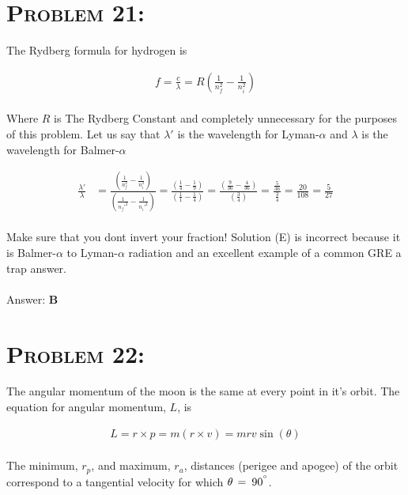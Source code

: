 \documentclass{article}
\begin{document}

\section{\textsc{Problem 21:}} The Rydberg formula for hydrogen is

\begin{gather}
f = \frac{c}{\lambda} = R \left(  \frac{1}{n_{f}^{2}} - \frac{1}{n_{i}^{2}}  \right)
\end{gather}
\\
Where $R$ is The Rydberg Constant and completely unnecessary for the purposes of this problem. Let us say that $\lambda '$ is the wavelength for Lyman-$\alpha$ and $\lambda$ is the wavelength for Balmer-$\alpha$

\begin{align}
\frac{\lambda' }{\lambda} &=  \frac{\left(  \frac{1}{n_{f}^{2}} - \frac{1}{n_{i}^{2}}  \right)}{\left(  \frac{1}{n_{f}'^{2}} - \frac{1}{n_{i}'^{2}}  \right)} = \frac{\left(   \frac{1}{4} - \frac{1}{9}   \right)   }{\left(    \frac{1}{1} -\frac{1}{4}   \right)} = \frac{\left(   \frac{9}{36} - \frac{4}{36}   \right)   }{\left(   \frac{3}{4}   \right)} = \frac{\frac{5}{36}}{\frac{3}{4}} = \frac{20}{108} = \boxed{\frac{5}{27}} \nonumber
\end{align}
\\
Make sure that you dont invert your fraction! Solution (E) is incorrect because it is Balmer-$\alpha$ to Lyman-$\alpha$ radiation and an excellent example of a common GRE a trap answer.
\\\\
Answer: \textbf{\textcolor{ProcessBlue}B}\\


\section{\textsc{Problem 22:}} The angular momentum of the moon is the same at every point in it's orbit. The equation for angular momentum, $L$, is

\begin{gather}
L = r \times p = m (r \times v) = m r v \sin{(\theta)}
\end{gather}
\\
The minimum, $r_{p}$, and maximum, $r_{a}$, distances (perigee and apogee) of the orbit correspond to a tangential velocity for which $\theta \hspace{.02in} = \hspace{.03in} 90^{^\circ}$.
\end{document}
